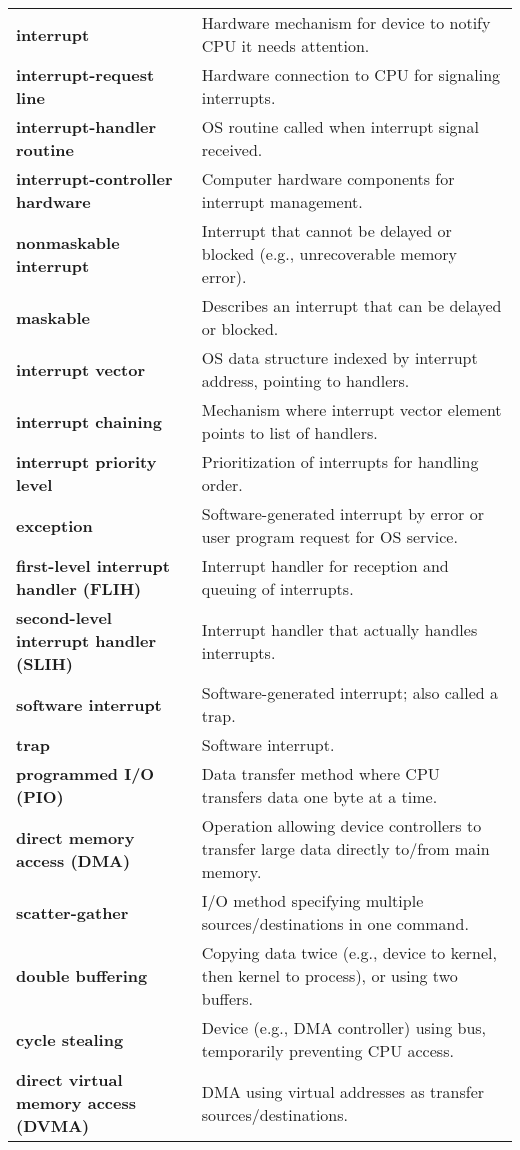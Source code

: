 \begin{tabular}{p{}p{}}
    \textbf{interrupt} & Hardware mechanism for device to notify CPU it needs attention. \\
    \textbf{interrupt-request line} & Hardware connection to CPU for signaling interrupts. \\
    \textbf{interrupt-handler routine} & OS routine called when interrupt signal received. \\
    \textbf{interrupt-controller hardware} & Computer hardware components for interrupt management. \\
    \textbf{nonmaskable interrupt} & Interrupt that cannot be delayed or blocked (e.g., unrecoverable memory error). \\
    \textbf{maskable} & Describes an interrupt that can be delayed or blocked. \\
    \textbf{interrupt vector} & OS data structure indexed by interrupt address, pointing to handlers. \\
    \textbf{interrupt chaining} & Mechanism where interrupt vector element points to list of handlers. \\
    \textbf{interrupt priority level} & Prioritization of interrupts for handling order. \\
    \textbf{exception} & Software-generated interrupt by error or user program request for OS service. \\
    \textbf{first-level interrupt handler (FLIH)} & Interrupt handler for reception and queuing of interrupts. \\
    \textbf{second-level interrupt handler (SLIH)} & Interrupt handler that actually handles interrupts. \\
    \textbf{software interrupt} & Software-generated interrupt; also called a trap. \\
    \textbf{trap} & Software interrupt. \\
    \textbf{programmed I/O (PIO)} & Data transfer method where CPU transfers data one byte at a time. \\
    \textbf{direct memory access (DMA)} & Operation allowing device controllers to transfer large data directly to/from main memory. \\
    \textbf{scatter-gather} & I/O method specifying multiple sources/destinations in one command. \\
    \textbf{double buffering} & Copying data twice (e.g., device to kernel, then kernel to process), or using two buffers. \\
    \textbf{cycle stealing} & Device (e.g., DMA controller) using bus, temporarily preventing CPU access. \\
    \textbf{direct virtual memory access (DVMA)} & DMA using virtual addresses as transfer sources/destinations. \\
    \bottomrule
\end{tabular}
